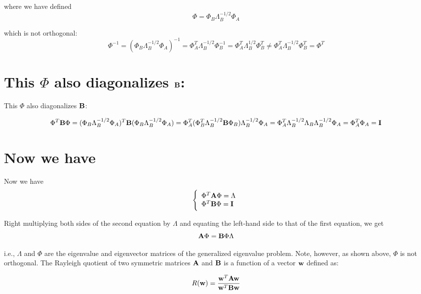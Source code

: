 \documentclass[11pt,letterpaper]{article}
\begin{document}
\noindent where we have defined 
\begin{equation}
\Phi=\Phi_B\Lambda^{-1/2}_B\Phi_A
\end{equation}

\noindent which is not orthogonal: 
\begin{equation}
\Phi^{-1}=(\Phi_B\Lambda^{-1/2}_B\Phi_A)^{-1} = \Phi_A^T\Lambda^{-1/2}_B\Phi_B^{-1}=\Phi_A^T\Lambda^{1/2}_B\Phi_B^T \ne \Phi_A^T\Lambda^{-1/2}_B\Phi_B^T = \Phi^T
\end{equation}

\section{This $\Phi$ also diagonalizes ${\bf B}$: }
This $\Phi$ also diagonalizes ${\bf B}$: 

\begin{equation}
\Phi^T{\bf B}\Phi =  (\Phi_B\Lambda^{-1/2}_B\Phi_A)^T {\bf B}(\Phi_B\Lambda_B^{-1/2}\Phi_A) = \Phi^T_A (\Phi_B^T\Lambda^{-1/2}_B{\bf B}\Phi_B)\Lambda^{-1/2}_B\Phi_A = \Phi_A^T\Lambda^{-1/2}_B\Lambda_B\Lambda^{-1/2}_B\Phi_A =\Phi_A^T\Phi_A={\bf I}
\end{equation}

\section{Now we have}
Now we have 
\begin{equation}
\left\{ \begin{array}{l} \Phi^T{\bf A}\Phi=\Lambda\\
\Phi^T{\bf B}\Phi={\bf I}\end{array}\right.
\end{equation}

\noindent Right multiplying both sides of the second equation by $\Lambda$ and equating the left-hand side to that of the first equation, we get 
\begin{equation}
{\bf A}\Phi={\bf B}\Phi\Lambda
\end{equation}

\noindent i.e., $\Lambda$ and $\Phi$ are the eigenvalue and eigenvector matrices of the generalized eigenvalue problem. Note, however, as shown above, $\Phi$ is not orthogonal.
The Rayleigh quotient of two symmetric matrices ${\bf A}$ and ${\bf B}$ is a function of a vector ${\bf w}$ defined as: 

\begin{equation}
R({\bf w})=\frac{{\bf w}^T{\bf A}{\bf w}}{{\bf w}^T{\bf B}{\bf w}}
\end{equation}
\end{document}
